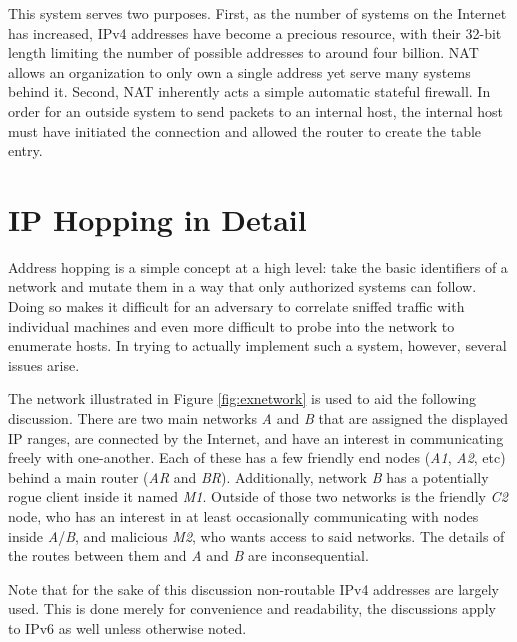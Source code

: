 \par This system serves two purposes. First, as the number of systems on the Internet has increased, \ac{IPv4} addresses have become a precious resource, with their 32-bit length limiting the number of possible addresses to around four billion. \ac{NAT} allows an organization to only own a single address yet serve many systems behind it. Second, \ac{NAT} inherently acts a simple automatic stateful firewall. In order for an outside system to send packets to an internal host, the internal host must have initiated the connection and allowed the router to create the table entry.


\section{IP Hopping in Detail}
\label{sec:hopping}
\par Address hopping is a simple concept at a high level: take the basic identifiers of a network and mutate them in a way that only authorized systems can follow. Doing so makes it difficult for an adversary to correlate sniffed traffic with individual machines and even more difficult to probe into the network to enumerate hosts. In trying to actually implement such a system, however, several issues arise. 

\par {} The network illustrated in Figure \ref{fig:exnetwork} is used to aid the following discussion. There are two main networks \textit{A} and \textit{B} that are assigned the displayed IP ranges, are connected by the Internet, and have an interest in communicating freely with one-another. Each of these has a few friendly end nodes (\textit{A1}, \textit{A2}, etc) behind a main router (\textit{AR} and \textit{BR}). Additionally, network \textit{B} has a potentially rogue client inside it named \textit{M1}. Outside of those two networks is the friendly \textit{C2} node, who has an interest in at least occasionally communicating with nodes inside \textit{A}/\textit{B}, and malicious \textit{M2}, who wants access to said networks. The details of the routes between them and \textit{A} and \textit{B} are inconsequential.

\par Note that for the sake of this discussion non-routable \ac{IPv4} addresses are largely used. This is done merely for convenience and readability, the discussions apply to \ac{IPv6} as well unless otherwise noted.

